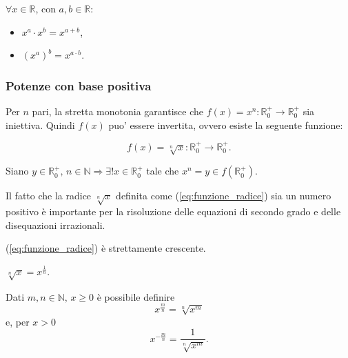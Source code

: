 \begin{property}
    $\forall x\in\mathbb R$, con $a,b\in\mathbb R$:
    \begin{itemize}
        \item $x^a\cdot x^b = x^{a+b}$,
        \item $(x^a)^b = x^{a\cdot b}$.
    \end{itemize}
\end{property}

\subsubsection{Potenze con base positiva}
Per $n$ pari, la stretta monotonia garantisce che $f(x)=x^n\colon \mathbb R_0^+\rightarrow\mathbb R_0^+$ sia iniettiva. Quindi $f(x)$ puo' essere invertita, ovvero esiste la seguente funzione:
\begin{definition}
    \begin{equation}\label{eq:funzione_radice}
    f(x)=\sqrt[n]{x}\colon \mathbb R_0^+\rightarrow\mathbb R_0^+.
\end{equation}
\end{definition}

\begin{theorem}
    Siano $y\in\mathbb R_0^+,\, n\in\mathbb N\Rightarrow\exists!x\in\mathbb R_0^+$ tale che $x^n=y\in f(\mathbb R_0^+)$.
\end{theorem}

Il fatto che la radice $\sqrt[n]{x}$ definita come (\ref{eq:funzione_radice}) sia un numero positivo è importante per la risoluzione delle equazioni di secondo grado e delle disequazioni irrazionali.

\begin{remark}
    (\ref{eq:funzione_radice}) è strettamente crescente.
\end{remark}

\begin{remark}
    $\sqrt[n]{x}=x^{\frac{1}{n}}$.
\end{remark}

Dati $m,n\in\mathbb N,\, x\geq 0$ è possibile definire
\begin{equation*}
    x^{\frac{m}{n}}=\sqrt[n]{x^m}
\end{equation*}
e, per $x>0$
\begin{equation*}
    x^{-\frac{m}{n}}=\frac{1}{\sqrt[n]{x^m}}.
\end{equation*}

